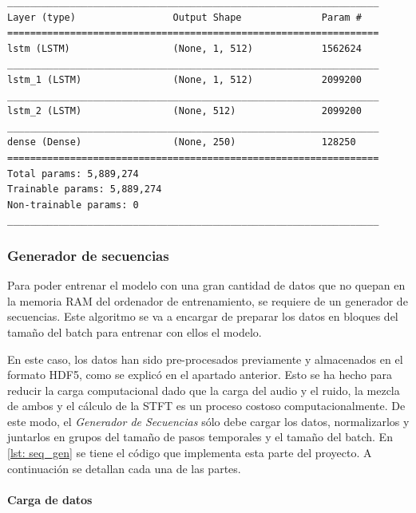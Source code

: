 \begin{lstlisting}[basicstyle=\tiny\ttfamily, caption={Resumen del modelo},captionpos=b, label={lst: model_resume},frame=tb,
xleftmargin=.2\textwidth, xrightmargin=.2\textwidth]
_________________________________________________________________
Layer (type)                 Output Shape              Param #   
=================================================================
lstm (LSTM)                  (None, 1, 512)            1562624   
_________________________________________________________________
lstm_1 (LSTM)                (None, 1, 512)            2099200   
_________________________________________________________________
lstm_2 (LSTM)                (None, 512)               2099200   
_________________________________________________________________
dense (Dense)                (None, 250)               128250    
=================================================================
Total params: 5,889,274
Trainable params: 5,889,274
Non-trainable params: 0
_________________________________________________________________
\end{lstlisting}

\subsubsection{Generador de secuencias}
Para poder entrenar el modelo con una gran cantidad de datos que no quepan en la memoria \gls{RAM} del ordenador de entrenamiento, se requiere de un generador de secuencias. Este algoritmo se va a encargar de preparar los datos en bloques del tamaño del batch para entrenar con ellos el modelo.

En este caso, los datos han sido pre-procesados previamente y almacenados en el formato \gls{HDF5}, como se explicó en el apartado anterior. Esto se ha hecho para reducir la carga computacional dado que la carga del audio y el ruido, la mezcla de ambos y el cálculo de la \gls{STFT} es un proceso costoso computacionalmente. De este modo, el \textit{Generador de Secuencias} sólo debe cargar los datos, normalizarlos y juntarlos en grupos del tamaño de pasos temporales y el tamaño del batch. En \ref{lst: seq_gen} se tiene el código que implementa esta parte del proyecto. A continuación se detallan cada una de las partes.

\paragraph{Carga de datos}

